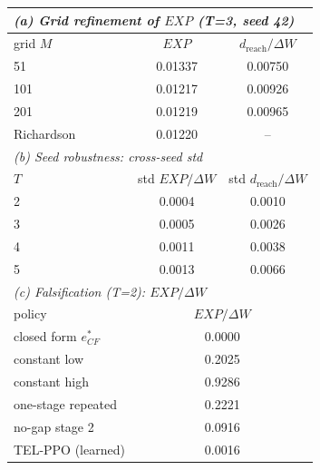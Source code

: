 \begin{tabular}{lcc}
\toprule
\multicolumn{3}{l}{\emph{(a) Grid refinement of $EXP$ (T=3, seed 42)}} \\
\midrule
grid $M$ & $EXP$ & $d_{\text{reach}}/\Delta W$ \\
\midrule
51 & 0.01337 & 0.00750 \\
101 & 0.01217 & 0.00926 \\
201 & 0.01219 & 0.00965 \\
Richardson & 0.01220 & -- \\
\midrule
\multicolumn{3}{l}{\emph{(b) Seed robustness: cross-seed std}} \\
\midrule
$T$ & std $EXP/\Delta W$ & std $d_{\text{reach}}/\Delta W$ \\
\midrule
2 & 0.0004 & 0.0010 \\
3 & 0.0005 & 0.0026 \\
4 & 0.0011 & 0.0038 \\
5 & 0.0013 & 0.0066 \\
\midrule
\multicolumn{3}{l}{\emph{(c) Falsification (T=2): $EXP/\Delta W$}} \\
\midrule
policy & \multicolumn{2}{c}{$EXP/\Delta W$} \\
\midrule
closed form $e^*_{CF}$ & \multicolumn{2}{c}{0.0000} \\
constant low & \multicolumn{2}{c}{0.2025} \\
constant high & \multicolumn{2}{c}{0.9286} \\
one-stage repeated & \multicolumn{2}{c}{0.2221} \\
no-gap stage 2 & \multicolumn{2}{c}{0.0916} \\
TEL-PPO (learned) & \multicolumn{2}{c}{0.0016} \\
\bottomrule
\end{tabular}

